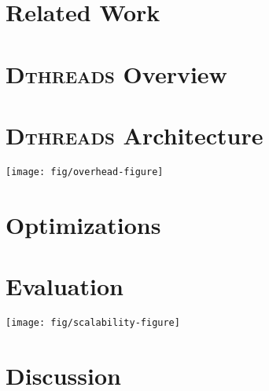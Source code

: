 \documentclass[9pt]{sigplanconf}
\newcommand{\dthreads}{{\scshape Dthreads}}
\newcommand{\Dthreads}{{\scshape Dthreads}}
\newcommand{\pthreads}{\texttt{pthreads}}
\begin{document}
\section{Related Work}


\section{{\bf \Large \Dthreads{}} Overview}


\section{{\bf \Large \Dthreads{}} Architecture}


\begin{figure*}[!t]
{\centering
\texttt{[image: fig/overhead-figure]}
\caption{Normalized execution time with respect to \pthreads{} (lower is better). For 9 of the 14 benchmarks, \dthreads{} runs nearly as fast or faster than \pthreads{}, while providing deterministic behavior.\label{fig:performance}}
}
\end{figure*}

\section{Optimizations}


\section{Evaluation}

\label{sec:evaluation}


\begin{figure*}
{\centering
\texttt{[image: fig/scalability-figure]}
\caption{
	Speedup with four and eight cores relative to two cores (higher is better).  \dthreads{} generally scales nearly as well or better than \pthreads{} and almost always as well or better than CoreDet.  CoreDet was unable to run \texttt{dedup} with two cores and \texttt{ferret} with four cores, so some scalability numbers are missing.\label{fig:scalability}}
}
\end{figure*}



\section{Discussion}

\end{document}
